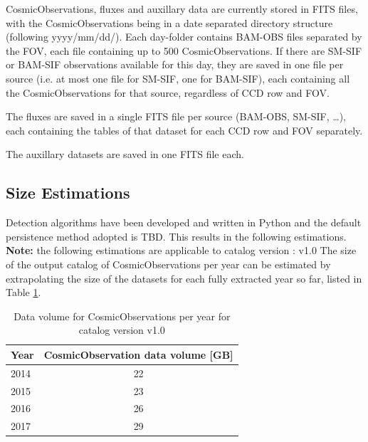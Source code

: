 \documentclass[a4paper, 11pt]{article}
\newcommand{\dmVersion}{v1.0}
\begin{document}

CosmicObservations, fluxes and auxillary data are currently stored in FITS files, with the CosmicObservations being in a date separated directory structure (following yyyy/mm/dd/). Each day-folder contains BAM-OBS files separated by the FOV, each file containing up to 500 CosmicObservations. If there are SM-SIF or BAM-SIF observations available for this day, they are saved in one file per source (i.e. at most one file for SM-SIF, one for BAM-SIF), each containing all the CosmicObservations for that source, regardless of CCD row and FOV.

The fluxes are saved in a single FITS file per source (BAM-OBS, SM-SIF, \dots), each containing the tables of that dataset for each CCD row and FOV separately.

The auxillary datasets are saved in one FITS file each.

\subsection{Size Estimations}

Detection algorithms have been developed and written in Python and the default persistence method adopted is TBD. This results in the following estimations.
\newline
\newline
\textbf{Note:} the following estimations are applicable to catalog version : \dmVersion  
\newline
\newline
The size of the output catalog of CosmicObservations per year can be estimated by extrapolating the size of the datasets for each fully extracted year so far, listed in Table \ref{tab:CosObs_volume}.

\begin{table}[!h]
\centering
{\begin{tabular}{|l|c|}
\hline
{Year} & {CosmicObservation data volume [GB]} \\ \hline
2014& 22 \\ \hline
2015& 23 \\ \hline
2016& 26 \\ \hline
2017& 29 \\ \hline
\end{tabular}}
\caption{Data volume for CosmicObservations per year for catalog version \dmVersion}
\label{tab:CosObs_volume}
\end{table}
\end{document}
